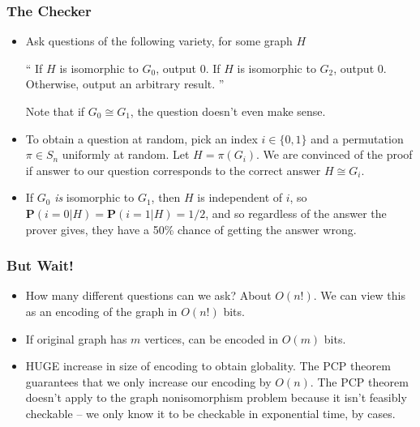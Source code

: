 \documentclass{beamer}
\begin{document}
\begin{frame}
    \frametitle{The Checker}

    \begin{itemize}
        \item Ask questions of the following variety, for some graph $H$
        \begin{center}
            `` If $H$ is isomorphic to $G_0$, output 0. If $H$ is isomorphic to $G_2$, output 0. Otherwise, output an arbitrary result. ''
        \end{center}
        Note that if $G_0 \cong G_1$, the question doesn't even make sense.

        \item To obtain a question at random, pick an index $i \in \{ 0, 1 \}$ and a permutation $\pi \in S_n$ uniformly at random. Let $H = \pi(G_i)$. We are convinced of the proof if answer to our question corresponds to the correct answer $H \cong G_i$.

        \item If $G_0$ {\it is} isomorphic to $G_1$, then $H$ is independent of $i$, so $\mathbf{P}(i = 0 | H) = \mathbf{P}(i = 1 | H) = 1/2$, and so regardless of the answer the prover gives, they have a 50\% chance of getting the answer wrong.
    \end{itemize}

\end{frame}

\begin{frame}
    \frametitle{But Wait!}

    \begin{itemize}
        \item How many different questions can we ask? About $O(n!)$. We can view this as an encoding of the graph in $O(n!)$ bits.
        \item If original graph has $m$ vertices, can be encoded in $O(m)$ bits.
        \item HUGE increase in size of encoding to obtain globality. The PCP theorem guarantees that we only increase our encoding by $O(n)$. The PCP theorem doesn't apply to the graph nonisomorphism problem because it isn't feasibly checkable -- we only know it to be checkable in exponential time, by cases.
    \end{itemize}
\end{frame}
\end{document}
